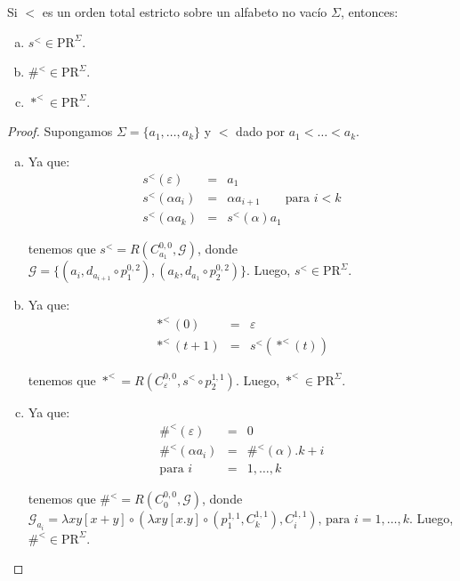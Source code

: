   \pagebreak
  \begin{lemma}
    \PN Si $<$ es un orden total estricto sobre un alfabeto no vacío $\Sigma$, entonces:

    \begin{enumerate}[a)]
      \item $s^{<} \in \mathrm{PR}^{\Sigma}$.
      \item $\#^{<} \in \mathrm{PR}^{\Sigma}$.
      \item $\ast^{<} \in \mathrm{PR}^{\Sigma}$.
    \end{enumerate}
  \end{lemma}
  \begin{proof}
    \PN Supongamos $\Sigma = \{a_{1}, \dotsc, a_{k}\}$ y $<$ dado por $a_{1} < \dotsc < a_{k}$.

    \begin{enumerate}[a)]
      \item Ya que:
        \begin{eqnarray*}
          s^{<}(\varepsilon) &=& a_{1} \\
          s^{<}(\alpha a_{i}) &=& \alpha a_{i+1} \qquad \text{para } i < k \\
          s^{<}(\alpha a_{k}) &=& s^{<}(\alpha) a_{1}
        \end{eqnarray*}

        \PN tenemos que $s^{<} = R(C_{a_{1}}^{0, 0}, \mathcal{G})$, donde $\mathcal{G} = \{\left(a_{i}, d_{a_{i+1}}
        \circ p_{1}^{0,2} \right), \left(a_{k}, d_{a_{1}} \circ p_{2}^{0,2} \right)\}$.
        \PN Luego, $s^{<} \in \mathrm{PR}^{\Sigma}$.

      \item Ya que:
        \begin{eqnarray*}
          \ast^{<}(0) &=& \varepsilon \\
          \ast^{<}(t+1) &=& s^{<}(\ast^{<}(t))
        \end{eqnarray*}

        \PN tenemos que $\ast^{<} = R(C_{\varepsilon}^{0,0}, s^{<} \circ p_{2}^{1,1})$. Luego, $\ast^{<} \in
        \mathrm{PR}^{\Sigma}$.

      \item Ya que:
        \begin{eqnarray*}
          \#^{<}(\varepsilon) &=& 0 \\
          \#^{<}(\alpha a_{i}) &=& \#^{<}(\alpha). k + i \\
          \text{para } i &=& 1, \dotsc, k
        \end{eqnarray*}

        \PN tenemos que $\#^{<} = R(C_{0}^{0, 0}, \mathcal{G})$, donde $\mathcal{G}_{a_{i}} = \lambda xy
        \left[x+y\right] \circ (\lambda xy \left[x.y\right] \circ (p_{1}^{1, 1}, C_{k}^{1, 1}), C_{i}^{1, 1})
        \text{, para } i = 1, \dotsc, k$. Luego, $\#^{<} \in \mathrm{PR}^{\Sigma}$.
    \end{enumerate}
  \end{proof}

